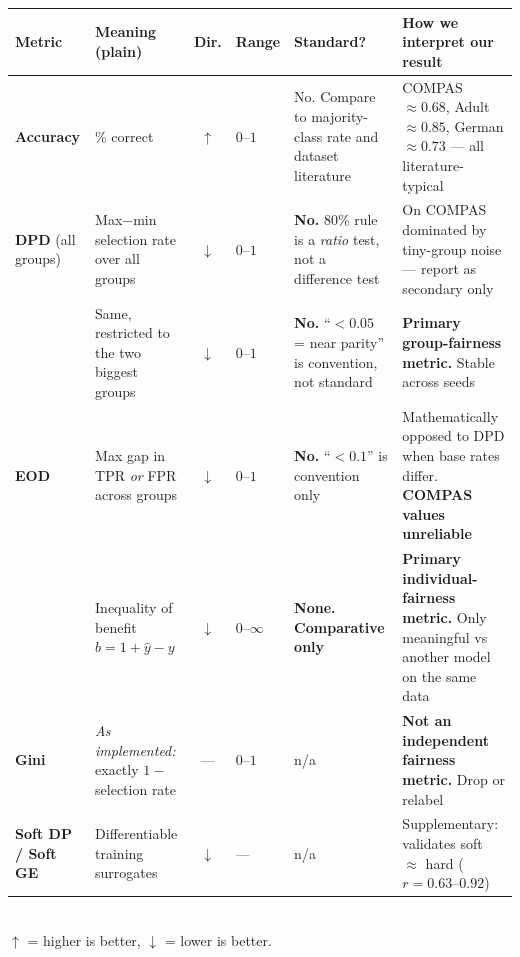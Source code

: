 \begin{center}
\scriptsize
\renewcommand{\arraystretch}{1.3}
\setlength{\tabcolsep}{3.5pt}
\begin{tabular}{@{}L{0.098\textwidth} L{0.205\textwidth} c L{0.055\textwidth} L{0.195\textwidth} L{0.245\textwidth}@{}}
\toprule
\textbf{Metric} & \textbf{Meaning (plain)} & \textbf{Dir.} & \textbf{Range}
& \textbf{Standard?} & \textbf{How we interpret our result} \\
\midrule

\textbf{Accuracy} & \% correct & $\uparrow$ & $0$--$1$ &
No. Compare to majority-class rate and dataset literature &
COMPAS ${\approx}0.68$, Adult ${\approx}0.85$, German ${\approx}0.73$ --- all
literature-typical \\

\textbf{DPD} (all groups) & Max$-$min selection rate over all groups &
$\downarrow$ & $0$--$1$ &
\textbf{No.} 80\% rule is a \emph{ratio} test, not a difference test &
On COMPAS dominated by tiny-group noise --- report as secondary only \\

\textbf{\dpdtwo{}} & Same, restricted to the two biggest groups &
$\downarrow$ & $0$--$1$ &
\textbf{No.} ``${<}0.05$ = near parity'' is convention, not standard &
\textbf{Primary group-fairness metric.} Stable across seeds \\

\textbf{EOD} & Max gap in TPR \emph{or} FPR across groups &
$\downarrow$ & $0$--$1$ &
\textbf{No.} ``${<}0.1$'' is convention only &
Mathematically opposed to DPD when base rates differ.
\textbf{COMPAS values unreliable} \\

\textbf{\getwo{}} & Inequality of benefit $b = 1{+}\hat y{-}y$ &
$\downarrow$ & $0$--$\infty$ &
\textbf{None. Comparative only} &
\textbf{Primary individual-fairness metric.} Only meaningful vs another model
on the same data \\

\textbf{Gini} & \emph{As implemented:} exactly $1-$selection rate &
--- & $0$--$1$ & n/a &
\textbf{Not an independent fairness metric.} Drop or relabel \\

\textbf{Soft DP / Soft GE} & Differentiable training surrogates &
$\downarrow$ & --- & n/a &
Supplementary: validates soft ${\approx}$ hard ($r = 0.63$--$0.92$) \\

\bottomrule
\end{tabular}
\\[4pt]
\footnotesize $\uparrow$ = higher is better, $\downarrow$ = lower is better.
\end{center}

